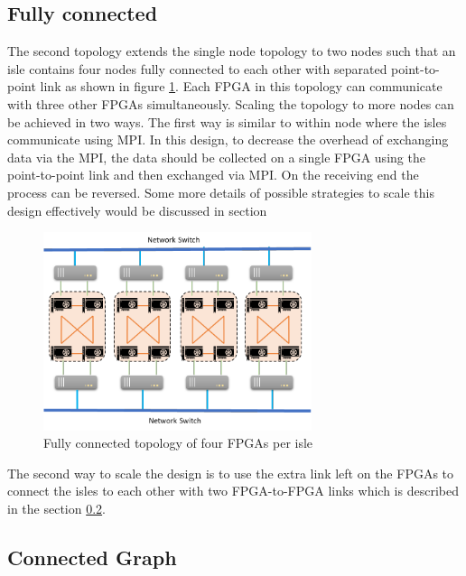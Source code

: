 \subsection{Fully connected}
\label{sec:fully_connect}

The second topology extends the single node topology to two nodes such that
an isle contains four nodes fully connected to each other with separated 
point-to-point link as shown in figure \ref{fig:fully_connect}.
Each FPGA in this topology can communicate with three
other FPGAs simultaneously. Scaling the topology to more nodes can be achieved
in two ways. The first way is similar to within node where the isles communicate
using MPI. In this design, to decrease the overhead of exchanging data via the
MPI, the data should be collected on a single FPGA using the point-to-point
link and then exchanged via MPI. On the receiving end the process can be
reversed. Some more details of possible strategies to scale this design
effectively would be discussed in section  

\begin{figure}[h]%
    \centering
    \includegraphics[width=0.7\textwidth]{images/full_connect}
    \caption{Fully connected topology of four FPGAs per isle}
    \label{fig:fully_connect}
\end{figure}

The second way to scale the design is to use the extra link left on the 
FPGAs to connect the isles to each other with two FPGA-to-FPGA links which is
described in the section \ref{sec:connected_graph}.

\subsection{Connected Graph}
\label{sec:connected_graph}

